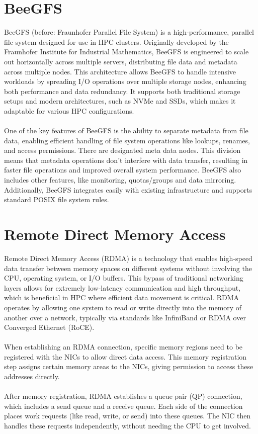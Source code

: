 \section{BeeGFS}
BeeGFS (before: Fraunhofer Parallel File System) is a high-performance, parallel file system designed for use in HPC clusters. Originally developed by the Fraunhofer Institute for Industrial Mathematics, BeeGFS is engineered to scale out horizontally across multiple servers, distributing file data and metadata across multiple nodes. This architecture allows BeeGFS to handle intensive workloads by spreading I/O operations over multiple storage nodes, enhancing both performance and data redundancy. It supports both traditional storage setups and modern architectures, such as NVMe and SSDs, which makes it adaptable for various HPC configurations.
\\\\
One of the key features of BeeGFS is the ability to separate metadata from file data, enabling efficient handling of file system operations like lookups, renames, and access permissions. There are designated meta data nodes. This division means that metadata operations don’t interfere with data transfer, resulting in faster file operations and improved overall system performance. BeeGFS also includes other features, like monitoring, quotas/groups and data mirroring. Additionally, BeeGFS integrates easily with existing infrastructure and supports standard POSIX file system rules.

\section{Remote Direct Memory Access}
Remote Direct Memory Access (RDMA) is a technology that enables high-speed data transfer between memory spaces on different systems without involving the CPU, operating system, or I/O buffers. This bypass of traditional networking layers allows for extremely low-latency communication and high throughput, which is  beneficial in HPC where efficient data movement is critical. RDMA operates by allowing one system to read or write directly into the memory of another over a network, typically via standards like InfiniBand or RDMA over Converged Ethernet (RoCE).
\\\\
When establishing an RDMA connection, specific memory regions need to be registered with the NICs to allow direct data access. This memory registration step assigns certain memory areas to the NICs, giving permission to access these addresses directly.
\\\\
After memory registration, RDMA establishes a queue pair (QP) connection, which includes a send queue and a receive queue. Each side of the connection places work requests (like read, write, or send) into these queues. The NIC then handles these requests independently, without needing the CPU to get involved. 


